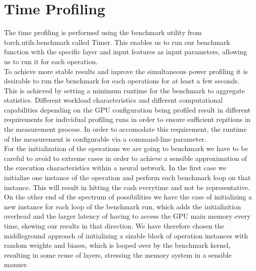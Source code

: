 \section{Time Profiling}




The time profiling is performed using the benchmark utility from torch.utils.benchmark called Timer. This enables us to run our benchmark function with the specific layer and input features as input parameters, allowing us to run it for each operation. \\
To achieve more stable results and inprove the simultaneous power profiling it is desirable to run the benchmark for each operations for at least a few seconds. This is achieved by setting a minimum runtime for the benchmark to aggregate statistics. Different workload characteristics and different computational capabilities depending on the GPU configuration being profiled result in different requirements for individual profiling runs in order to ensure sufficient repitions in the measurement process. In order to accomodate this requirement, the runtime of the measurement is configurable via a command-line parameter. \\
For the initialization of the operations we are going to benchmark we have to be careful to avoid to extreme cases in order to achieve a sensible approximation of the execution characteristics within a neural network. In the first case we initialize one instance of the operation and perform each benchmark loop on that instance. This will result in hitting the cash everytime and not be representative. On the other end of the spectrum of possibilities we have the case of initializing a new instance for each loop of the benchmark run, which adds the initializition overhead and the larger latency of having to access the GPU main memory every time, skewing our results in that direction. We have therefore chosen the middleground approach of initializing a sizable block of operation instances with random weights and biases, which is looped over by the benchmark kernel, resulting in some reuse of layers, stressing the memory system in a sensible manner. \\


